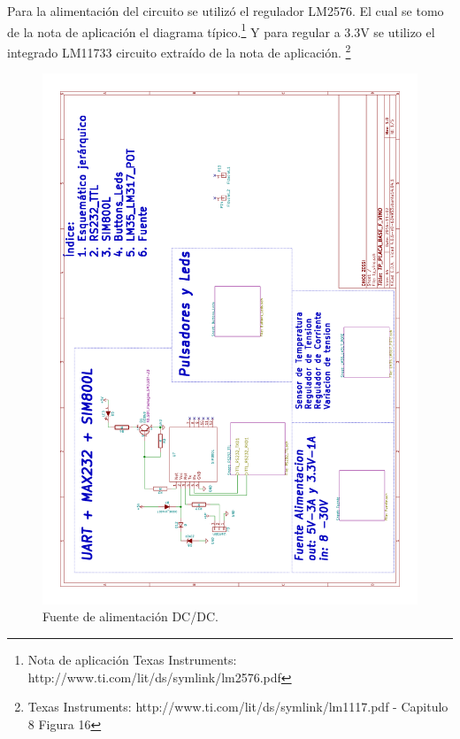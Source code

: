 Para la alimentación del circuito se utilizó el regulador LM2576. El cual se tomo de la nota de aplicación el diagrama típico.\footnote{Nota de aplicación Texas Instruments: http://www.ti.com/lit/ds/symlink/lm2576.pdf}
Y para regular a 3.3V se utilizo el integrado LM11733 circuito extraído de la nota de aplicación. \footnote{ Texas Instruments: http://www.ti.com/lit/ds/symlink/lm1117.pdf - Capitulo 8 Figura 16 } 
\begin{figure}[h]
      \centering
      \includegraphics[page=3,scale=0.3,angle=270]{./Figures/schematic.pdf}
      \caption{Fuente de alimentación DC/DC.}
      \label{fig:fuente}
\end{figure}

